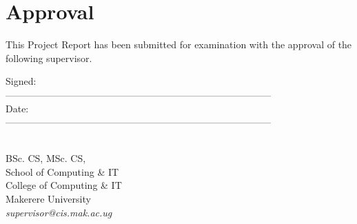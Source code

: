 \cleardoublepage
{}
\chapter*{Approval}
This Project Report has been submitted for examination with the approval of the following supervisor.

\vspace{1.0em}
\noindent
Signed: \\
-----------------------------------------------------------------------------------\\
Date: \\
-----------------------------------------------------------------------------------\\

\vspace{2.0em}

 \\
BSc. CS, MSc. CS,\\
School of Computing \& IT\\
College of Computing \& IT\\
Makerere University\\
\emph{supervisor@cis.mak.ac.ug}
\newpage
